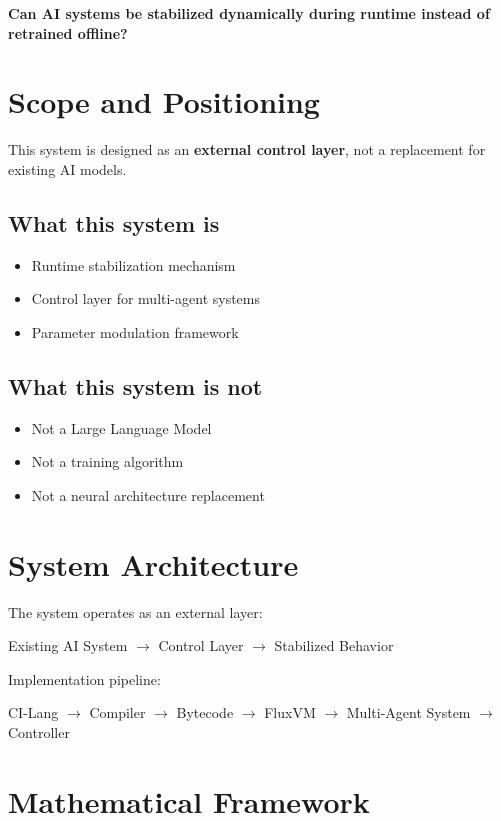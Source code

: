 \documentclass[11pt]{article}
\begin{document}
\textbf{Can AI systems be stabilized dynamically during runtime instead of retrained offline?}

\section{Scope and Positioning}

This system is designed as an \textbf{external control layer}, not a replacement for existing AI models.

\subsection{What this system is}
\begin{itemize}
\item Runtime stabilization mechanism
\item Control layer for multi-agent systems
\item Parameter modulation framework
\end{itemize}

\subsection{What this system is not}
\begin{itemize}
\item Not a Large Language Model
\item Not a training algorithm
\item Not a neural architecture replacement
\end{itemize}

\section{System Architecture}

The system operates as an external layer:

\begin{center}
Existing AI System $\rightarrow$ Control Layer $\rightarrow$ Stabilized Behavior
\end{center}

Implementation pipeline:

\begin{center}
CI-Lang $\rightarrow$ Compiler $\rightarrow$ Bytecode $\rightarrow$ FluxVM $\rightarrow$ Multi-Agent System $\rightarrow$ Controller
\end{center}

\section{Mathematical Framework}
\end{document}
